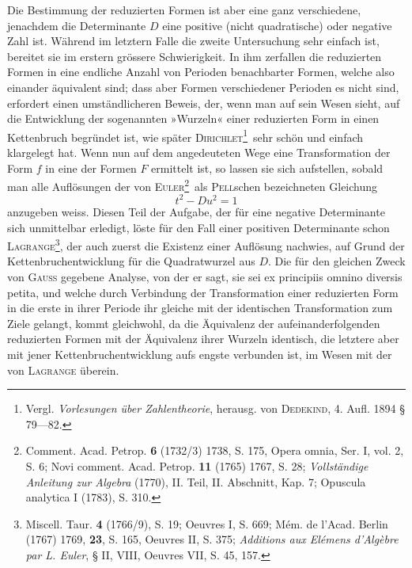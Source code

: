 Die Bestimmung der reduzierten Formen ist aber eine ganz verschiedene, jenachdem die Determinante \(D\) eine positive (nicht quadratische) oder negative Zahl ist. Während im letztern Falle die zweite Untersuchung sehr einfach ist, bereitet sie im erstern grössere Schwierigkeit. In ihm zerfallen die reduzierten Formen in eine endliche Anzahl von Perioden benachbarter Formen, welche also einander äquivalent sind; dass aber Formen verschiedener Perioden es nicht sind, erfordert einen umständlicheren Beweis, der, wenn man auf sein Wesen sieht, auf die Entwicklung der sogenannten »Wurzeln« einer reduzierten Form in einen Kettenbruch begründet ist, wie später \textsc{Dirichlet}\begingroup\renewcommand{\thefootnote}{**)}\footnote{Vergl. \textit{Vorlesungen über Zahlentheorie}, herausg. von \textsc{Dedekind}, 4. Aufl. 1894 § 79—82.}\endgroup\ sehr schön und einfach klargelegt hat. Wenn nun auf dem angedeuteten Wege eine Transformation der Form \(f\) in eine der Formen \(F\) ermittelt ist, so lassen sie sich  aufstellen, sobald man alle Auflösungen der von \textsc{Euler}\begingroup\renewcommand{\thefootnote}{***)}\footnote{Comment. Acad. Petrop. \textbf{6} (1732/3) 1738, S. 175, Opera omnia, Ser. I, vol. 2, S. 6; Novi comment. Acad. Petrop. \textbf{11} (1765) 1767, S. 28; \textit{Vollständige Anleitung zur Algebra} (1770), II. Teil, II. Abschnitt, Kap. 7; Opuscula analytica I (1783), S. 310.}\endgroup\ als \textsc{Pell}schen bezeichneten Gleichung
\[
t^2-Du^2=1
\]
anzugeben weiss. Diesen Teil der Aufgabe, der für eine negative Determinante sich unmittelbar erledigt, löste für den Fall einer positiven Determinante schon \textsc{Lagrange}\begingroup\renewcommand{\thefootnote}{\ensuremath{\dagger})}\footnote{Miscell. Taur. \textbf{4} (1766/9), S. 19; Oeuvres I, S. 669; Mém. de l’Acad. Berlin (1767) 1769, \textbf{23}, S. 165, Oeuvres II, S. 375; \textit{Additions aux Elémens d’Algèbre par L. Euler}, § II, VIII, Oeuvres VII, S. 45, 157.}\endgroup, der auch zuerst die Existenz einer Auflösung nachwies, auf Grund der Kettenbruchentwicklung für die Quadratwurzel aus \(D\). Die für den
\newpage{}
\noindent gleichen Zweck von \textsc{Gauss} gegebene Analyse, von der er sagt, sie sei ex principiis omnino diversis petita, und welche durch Verbindung der Transformation einer reduzierten Form in die erste in ihrer Periode ihr gleiche mit der identischen Transformation zum Ziele gelangt, kommt gleichwohl, da die Äquivalenz der aufeinanderfolgenden reduzierten Formen mit der Äquivalenz ihrer Wurzeln identisch, die letztere aber mit jener Kettenbruchentwicklung aufs engste verbunden ist, im Wesen mit der von \textsc{Lagrange} überein.


